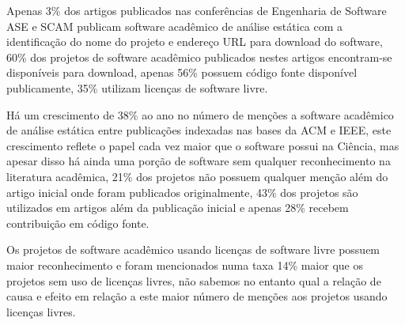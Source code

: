 \label{conclusoes}


Apenas 3\% dos artigos publicados nas conferências de Engenharia de Software
ASE e SCAM publicam software acadêmico de análise estática com a identificação
do nome do projeto e endereço URL para download do software, 60\% dos projetos
de software acadêmico publicados nestes artigos encontram-se disponíveis para
download, apenas 56\% possuem código fonte disponível publicamente, 35\%
utilizam licenças de software livre.



Há um crescimento de 38\% ao ano no número de menções a software acadêmico de
análise estática entre publicações indexadas nas bases da ACM e IEEE, este
crescimento reflete o papel cada vez maior que o software possui na Ciência,
mas apesar disso há ainda uma porção de software sem qualquer reconhecimento na
literatura acadêmica, 21\% dos projetos não possuem qualquer menção além do
artigo inicial onde foram publicados originalmente, 43\% dos projetos são
utilizados em artigos além da publicação inicial e apenas 28\% recebem
contribuição em código fonte.


Os projetos de software acadêmico usando licenças de software livre possuem
maior reconhecimento e foram mencionados numa taxa 14\% maior que os projetos
sem uso de licenças livres, não sabemos no entanto qual a relação de causa e
efeito em relação a este maior número de menções aos projetos usando licenças
livres.


